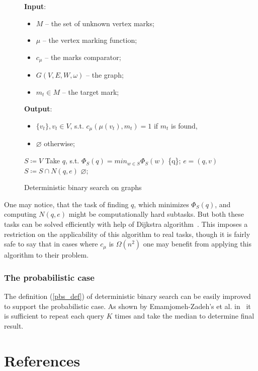 \begin{figure}[H]
    \begin{framed}
        \begin{algorithmic}[1]
            \State \textbf{Input}:
            \begin{itemize}
            	\item $M$ -- the set of unknown vertex marks;
            	\item $\mu$ -- the vertex marking function;
            	\item $c_\mu$ -- the marks comparator;
            	\item $G(V, E, W, \omega)$ -- the graph;
            	\item $m_t \in M$ -- the target mark;
            \end{itemize}
            
            \State \textbf{Output}:
			\begin{itemize}
            	\item $\{v_t\}, v_t \in V$, s.t. $c_\mu(\mu(v_t), m_t) = 1$ if $m_t$ is found,
            	\item $\varnothing$ otherwise;
			\end{itemize}

			\State $S \coloneqq V$
                \State Take $q$, s.t. $\Phi_S(q) = min_{w \in S} \Phi_S(w)$
                    \State \Return \{q\};
                    \State $e = (q, v)$
                    \State $S \coloneqq S \cap N(q,e)$
                \EndIf
            \EndWhile
            \State \Return $\varnothing$;
        \end{algorithmic}
    \end{framed}
    \caption{Deterministic binary search on graphs}
    \label{algDet}
\end{figure}


One may notice, that the task of finding $q$, which minimizes $\Phi_S(q)$, and computing $N(q, e)$ might be computationally hard subtasks. But both these tasks can be solved efficiently with help of Dijkstra algorithm~\cite{dijkstra}. This imposes a restriction on the applicability of this algorithm to real tasks, though it is fairly safe to say that in cases where $c_\mu$ is $\Omega(n^2)$ one may benefit from applying this algorithm to their problem.



\subsubsection*{The probabilistic case}
The definition (\ref{pbs_def}) of deterministic binary search can be easily improved to support the probabilistic case. As shown by Emamjomeh-Zadeh's et al. in~\cite{main} it is sufficient to repeat each query $K$ times and take the median to determine final result.  


\section{References}
\nocite{main, karp, benor, annals}
\printbibliography[heading=none]
